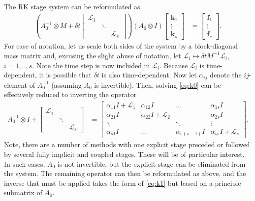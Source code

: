 \documentclass[a4paper,10pt]{article}
\begin{document}
The RK stage system can be reformulated as
%
\begin{align*}
\left( A_0^{-1}\otimes M + \delta t \begin{bmatrix} \mathcal{L}_1  & \\ & \ddots \\ && \mathcal{L}_s\end{bmatrix}\right)
	(A_0\otimes I)	\begin{bmatrix} \mathbf{k}_1 \\ \vdots \\ \mathbf{k}_s \end{bmatrix} 
& = \begin{bmatrix} \mathbf{f}_1 \\ \vdots \\ \mathbf{f}_s \end{bmatrix}.
\end{align*}
%
For ease of notation, let us scale both sides of the system by a block-diagonal mass matrix 
and, excusing the slight abuse of notation, let $\mathcal{L}_i \mapsto \delta t M^{-1}\mathcal{L}_i$,
$i=1,..,s$. Note the time step is now included in $\mathcal{L}_i$. Because $\mathcal{L}_i$ is
time-dependent, it is possible that $\delta t$ is also time-dependent.
Now let $\alpha_{ij}$ denote the $ij$-element of $A_0^{-1}$ (assuming $A_0$ is
invertible). Then, solving \eqref{eq:k0} can be effectively reduced to inverting the operator
%
\begin{align}\label{eq:k1}
A_0^{-1}\otimes I + \begin{bmatrix} \mathcal{L}_1  & \\ & \ddots \\ && \mathcal{L}_s\end{bmatrix}
	& = 
\begin{bmatrix} \alpha_{11}I + \mathcal{L}_1 & \alpha_{12}I & ... & \alpha_{1s}I \\
	\alpha_{21}I & \alpha_{22}I + \mathcal{L}_2 & & \alpha_{2s}I \\
	\ddots & & \ddots & \vdots \\ \alpha_{s1}I & ... & \alpha_{s(s-1)}I & \alpha_{ss}I + \mathcal{L}_s \end{bmatrix}.
\end{align}
%
Note, there are a number of methods with one explicit stage preceded or followed by several
fully implicit and coupled stages. These will be of particular interest. In such cases, $A_0$ is
not invertible, but the explicit stage can be eliminated from the system. The remaining operator
can then be reformulated as above, and the inverse that must be applied takes the form of
\eqref{eq:k1} but based on a principle submatrix of $A_0$. 
\end{document}
